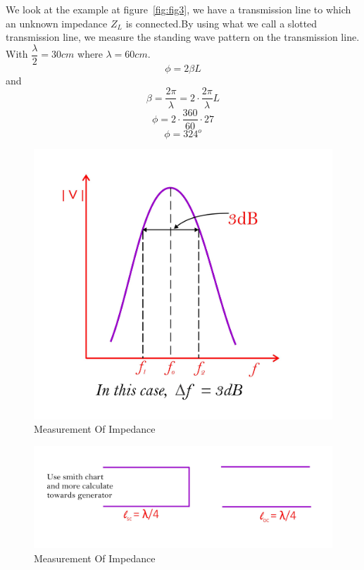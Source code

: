 \begin{example}
We look at the example at figure~\ref{fig:fig3}, we have a transmission line to which an unknown impedance $Z_L$ is connected.By using what we call a slotted transmission line, we measure the standing wave pattern on the transmission line. With $\dfrac{\lambda}{2}=30cm$ where $\lambda=60cm.$
$$\phi=2\beta L$$ 
and 
\begin{dmath*}
\beta=\dfrac{2\pi}{\lambda}=2\cdot\dfrac{2\pi}{\lambda} L
\end{dmath*}
$$\phi=2\cdot\dfrac{360}{60}\cdot27$$
$$\phi=324^{o}$$
\begin{figure}[h]
\centering
\includegraphics[width=1\linewidth]{./graphics/fig2}
\caption{Measurement Of Impedance}
\end{figure}
\begin{figure}[h]
\centering
\includegraphics[width=1\linewidth]{./graphics/fig1}
\caption{Measurement Of Impedance}
\end{figure}


\end{example}
